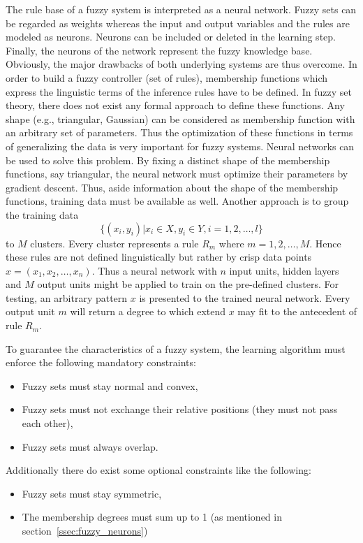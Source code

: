 The rule base of a fuzzy system is interpreted as a neural network.
Fuzzy sets can be regarded as weights whereas the input and output variables and the rules are modeled as neurons.
Neurons can be included or deleted in the learning step.
Finally, the neurons of the network represent the fuzzy knowledge base.
Obviously, the major drawbacks of both underlying systems are thus overcome.
In order to build a fuzzy controller (set of rules), membership functions which express the linguistic terms of the inference rules have to be defined.
In fuzzy set theory, there does not exist any formal approach to define these functions.
Any shape (e.g., triangular, Gaussian) can be considered as membership function with an arbitrary set of parameters.
Thus the optimization of these functions in terms of generalizing the data is very important for fuzzy systems.
Neural networks can be used to solve this problem.
By fixing a distinct shape of the membership functions, say triangular, the neural network must optimize their parameters by gradient descent.
Thus, aside information about the shape of the membership functions, training data must be available as well.
Another approach is to group the training data $$ \{(x_i,y_i) | x_i \in X, y_i \in Y, i = 1,2,\dots,l\}$$to $M$ clusters.
Every cluster represents a rule $R_m$ where $m=1,2,\dots,M$.
Hence these rules are not defined linguistically but rather by crisp data points $x=(x_1, x_2, \dots,x_n)$.
Thus a neural network with $n$ input units, hidden layers and $M$ output units might be applied to train on the pre-defined clusters.
For testing, an arbitrary pattern $x$ is presented to the trained neural network.
Every output unit $m$ will return a degree to which extend $x$ may fit to the antecedent of rule $R_m$.

To guarantee the characteristics of a fuzzy system, the learning algorithm must enforce the following mandatory constraints:
\begin{itemize}
\item Fuzzy sets must stay normal and convex,
\item Fuzzy sets must not exchange their relative positions (they must not pass each other),
\item Fuzzy sets must always overlap.
\end{itemize}

Additionally there do exist some optional constraints like the following:
\begin{itemize}
\item Fuzzy sets must stay symmetric,
\item The membership degrees must sum up to 1 (as mentioned in section~\ref{ssec:fuzzy_neurons})
\end{itemize}
